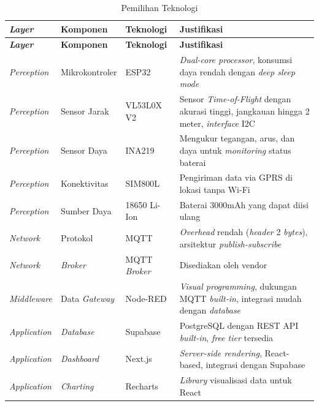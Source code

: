 \begin{longtable}{| l | l | l | p{5cm} |}
  \caption{Pemilihan Teknologi}
  \label{tab:pemilihan-teknologi} \\
    \hline
    \textbf{\textit{Layer}} & \textbf{Komponen} & \textbf{Teknologi} & \textbf{Justifikasi} \\
    \hline
  \endfirsthead
    \hline
    \textbf{\textit{Layer}} & \textbf{Komponen} & \textbf{Teknologi} & \textbf{Justifikasi} \\
    \hline
  \endhead
    \hline
  \endfoot
    \textit{Perception} & Mikrokontroler & ESP32 & \textit{Dual-core processor}, konsumsi daya rendah dengan \textit{deep sleep mode} \\
    \hline
    \textit{Perception} & Sensor Jarak & VL53L0X V2 & Sensor \textit{Time-of-Flight} dengan akurasi tinggi, jangkauan hingga 2 meter, \textit{interface} I2C \\
    \hline
    \textit{Perception} & Sensor Daya & INA219 & Mengukur tegangan, arus, dan daya untuk \textit{monitoring} status baterai \\
    \hline
    \textit{Perception} & Konektivitas & SIM800L & Pengiriman data via GPRS di lokasi tanpa Wi-Fi \\
    \hline
    \textit{Perception} & Sumber Daya & 18650 Li-Ion & Baterai 3000mAh yang dapat diisi ulang \\
    \hline
    \textit{Network} & Protokol & MQTT & \textit{Overhead} rendah (\textit{header} 2 \textit{bytes}), arsitektur \textit{publish-subscribe} \\
    \hline
    \textit{Network} & \textit{Broker} & MQTT \textit{Broker} & Disediakan oleh vendor \\
    \hline
    \textit{Middleware} & Data \textit{Gateway} & Node-RED & \textit{Visual programming}, dukungan MQTT \textit{built-in}, integrasi mudah dengan \textit{database} \\
    \hline
    \textit{Application} & \textit{Database} & Supabase & PostgreSQL dengan REST API \textit{built-in}, \textit{free tier} tersedia \\
    \hline
    \textit{Application} & \textit{Dashboard} & Next.js & \textit{Server-side rendering}, React-based, integrasi dengan Supabase \\
    \hline
    \textit{Application} & \textit{Charting} & Recharts & \textit{Library} visualisasi data untuk React \\
    \hline
\end{longtable}

